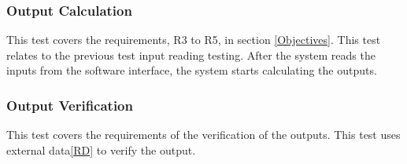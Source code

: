 \documentclass[12pt, titlepage]{article}
\begin{document}
\subsubsection{Output Calculation}\label{tP_OC}


This test covers the requirements, R3 to R5, in section \ref{Objectives}.
This test relates to the previous test input reading testing. After the 
system reads the inputs from the software interface, the system starts
calculating the outputs.




\subsubsection{Output Verification}\label{tP_VO} 

This test covers the requirements of the verification of the outputs. This test
uses external data\ref{RD} to verify the output.
\end{document}
